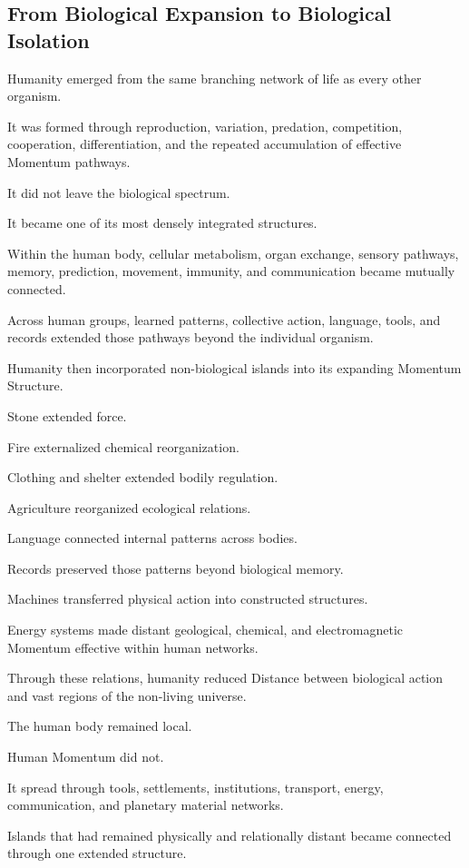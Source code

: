 \subsection*{\textbf{From Biological Expansion to Biological Isolation}} 


Humanity emerged from the same branching network of life as every other organism.

It was formed through reproduction, variation, predation, competition, cooperation, differentiation, and the repeated accumulation of effective Momentum pathways.

It did not leave the biological spectrum.

It became one of its most densely integrated structures.

Within the human body, cellular metabolism, organ exchange, sensory pathways, memory, prediction, movement, immunity, and communication became mutually connected.

Across human groups, learned patterns, collective action, language, tools, and records extended those pathways beyond the individual organism.

Humanity then incorporated non-biological islands into its expanding Momentum Structure.

Stone extended force.

Fire externalized chemical reorganization.

Clothing and shelter extended bodily regulation.

Agriculture reorganized ecological relations.

Language connected internal patterns across bodies.

Records preserved those patterns beyond biological memory.

Machines transferred physical action into constructed structures.

Energy systems made distant geological, chemical, and electromagnetic Momentum effective within human networks.

Through these relations, humanity reduced Distance between biological action and vast regions of the non-living universe.

The human body remained local.

Human Momentum did not.

It spread through tools, settlements, institutions, transport, energy, communication, and planetary material networks.

Islands that had remained physically and relationally distant became connected through one extended structure.

